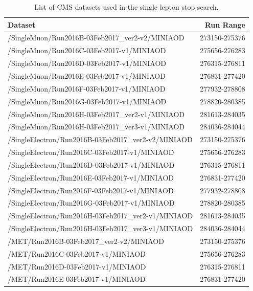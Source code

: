 \begin{table}[htbp]
\centering
\caption{List of CMS datasets used in the single lepton stop search.}
\label{tab:stop:datasets}
\begin{tabular}{|l|r|}
\hline
Dataset & Run Range \\
\hline
  /SingleMuon/Run2016B-03Feb2017\_ver2-v2/MINIAOD     & 273150-275376 \\
  /SingleMuon/Run2016C-03Feb2017-v1/MINIAOD           & 275656-276283 \\
  /SingleMuon/Run2016D-03Feb2017-v1/MINIAOD           & 276315-276811 \\
  /SingleMuon/Run2016E-03Feb2017-v1/MINIAOD           & 276831-277420 \\
  /SingleMuon/Run2016F-03Feb2017-v1/MINIAOD           & 277932-278808 \\
  /SingleMuon/Run2016G-03Feb2017-v1/MINIAOD           & 278820-280385 \\
  /SingleMuon/Run2016H-03Feb2017\_ver2-v1/MINIAOD     & 281613-284035 \\
  /SingleMuon/Run2016H-03Feb2017\_ver3-v1/MINIAOD     & 284036-284044 \\
\hline
  /SingleElectron/Run2016B-03Feb2017\_ver2-v2/MINIAOD & 273150-275376 \\
  /SingleElectron/Run2016C-03Feb2017-v1/MINIAOD       & 275656-276283 \\
  /SingleElectron/Run2016D-03Feb2017-v1/MINIAOD       & 276315-276811 \\
  /SingleElectron/Run2016E-03Feb2017-v1/MINIAOD       & 276831-277420 \\
  /SingleElectron/Run2016F-03Feb2017-v1/MINIAOD       & 277932-278808 \\
  /SingleElectron/Run2016G-03Feb2017-v1/MINIAOD       & 278820-280385 \\
  /SingleElectron/Run2016H-03Feb2017\_ver2-v1/MINIAOD & 281613-284035 \\
  /SingleElectron/Run2016H-03Feb2017\_ver3-v1/MINIAOD & 284036-284044 \\
\hline
  /MET/Run2016B-03Feb2017\_ver2-v2/MINIAOD            & 273150-275376 \\
  /MET/Run2016C-03Feb2017-v1/MINIAOD                  & 275656-276283 \\
  /MET/Run2016D-03Feb2017-v1/MINIAOD                  & 276315-276811 \\
  /MET/Run2016E-03Feb2017-v1/MINIAOD                  & 276831-277420 \\

\end{tabular}
\end{table}
